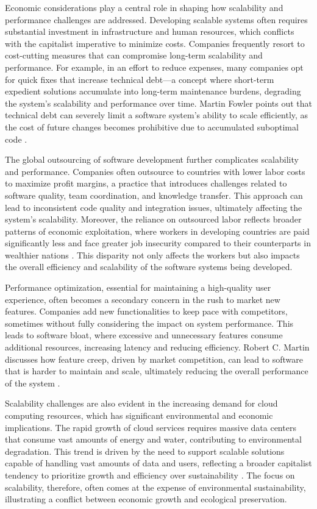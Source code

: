 \begin{refsection}
Economic considerations play a central role in shaping how scalability and performance challenges are addressed. Developing scalable systems often requires substantial investment in infrastructure and human resources, which conflicts with the capitalist imperative to minimize costs. Companies frequently resort to cost-cutting measures that can compromise long-term scalability and performance. For example, in an effort to reduce expenses, many companies opt for quick fixes that increase technical debt—a concept where short-term expedient solutions accumulate into long-term maintenance burdens, degrading the system's scalability and performance over time. Martin Fowler points out that technical debt can severely limit a software system's ability to scale efficiently, as the cost of future changes becomes prohibitive due to accumulated suboptimal code \cite[pp.~53-58]{fowler1999refactoring}.

The global outsourcing of software development further complicates scalability and performance. Companies often outsource to countries with lower labor costs to maximize profit margins, a practice that introduces challenges related to software quality, team coordination, and knowledge transfer. This approach can lead to inconsistent code quality and integration issues, ultimately affecting the system's scalability. Moreover, the reliance on outsourced labor reflects broader patterns of economic exploitation, where workers in developing countries are paid significantly less and face greater job insecurity compared to their counterparts in wealthier nations \cite[pp.~172-176]{friedman2012world}. This disparity not only affects the workers but also impacts the overall efficiency and scalability of the software systems being developed.

Performance optimization, essential for maintaining a high-quality user experience, often becomes a secondary concern in the rush to market new features. Companies add new functionalities to keep pace with competitors, sometimes without fully considering the impact on system performance. This leads to software bloat, where excessive and unnecessary features consume additional resources, increasing latency and reducing efficiency. Robert C. Martin discusses how feature creep, driven by market competition, can lead to software that is harder to maintain and scale, ultimately reducing the overall performance of the system \cite[pp.~113-117]{martin2022clean}.

Scalability challenges are also evident in the increasing demand for cloud computing resources, which has significant environmental and economic implications. The rapid growth of cloud services requires massive data centers that consume vast amounts of energy and water, contributing to environmental degradation. This trend is driven by the need to support scalable solutions capable of handling vast amounts of data and users, reflecting a broader capitalist tendency to prioritize growth and efficiency over sustainability \cite[pp.~217-220]{braverman1998labor}. The focus on scalability, therefore, often comes at the expense of environmental sustainability, illustrating a conflict between economic growth and ecological preservation.


\end{refsection}
